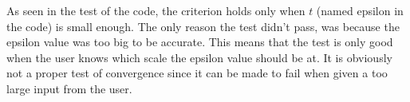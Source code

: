As seen in the test of the code, the criterion holds only when $t$ (named epsilon in the code) is small enough. The only reason the test didn't pass, was because the epsilon value was too big to be accurate. This means that the test is only good when the user knows which scale the epsilon value should be at.
It is obviously not a proper test of convergence since it can be made to fail when given a too large input from the user.